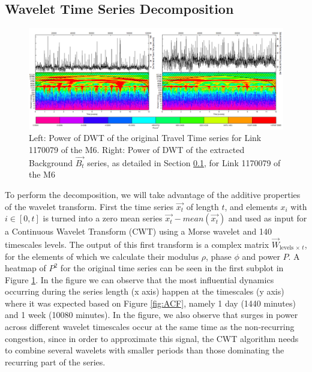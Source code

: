 \documentclass[a4paper, 10pt, conference]{ieeeconf}      %
\begin{document}
\subsection{Wavelet Time Series Decomposition}\label{decomposition}
\begin{figure}[htbp]
	\centerline{\includegraphics[width=\linewidth]{./images/WT_combined_1500_600.png}}
	\caption{Left: Power of DWT of the original Travel Time series for Link 1170079 of the M6.
	Right: Power of DWT of the extracted Background $\vec{B_t}$ series, as detailed in Section \ref{decomposition}, for Link 1170079 of the M6}
	\label{fig:wt}
\end{figure}
To perform the decomposition, we will take advantage of the additive properties of the wavelet transform. First the time series $\vec{x_t}$ of length $t$, and elements $x_i$ with $i \in [0,t]$ is turned into a zero mean series $\vec{x_t} - mean(\vec{x_t})$ and used as input for a Continuous Wavelet Transform (CWT) \cite{daubechies} \cite{mallat} using a Morse wavelet \cite{morse} and 140 timescales levels.
The output of this first transform is a complex matrix $\vec{W}_{\textrm{levels}\,\times\, t}$, for the elements of which we calculate their modulus $\rho$, phase $\phi$ and power $P$. 
A heatmap of $P^2$ for the original time series can be seen in the first subplot in Figure \ref{fig:wt}.
In the figure we can observe that the most influential dynamics occurring during the series length (x axis) happen at the timescales (y axis) where it was expected based on Figure \ref{fig:ACF}, namely 1 day (1440 minutes) and 1 week (10080 minutes).
In the figure, we also observe that surges in power across different wavelet timescales occur at the same time as the non-recurring congestion, since in order to approximate this signal, the CWT algorithm needs to combine several wavelets with smaller periods than those dominating the recurring part of the series. 
\end{document}
